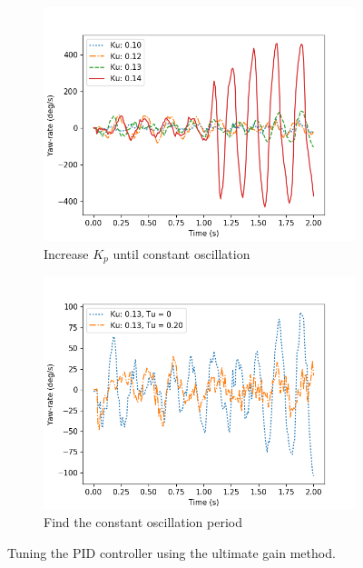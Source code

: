 
\begin{figure}
	\begin{subfigure}[b]{0.49\textwidth}
		\includegraphics[width=\textwidth]{pics/straight_ku.png}
		\caption{Increase $K_p$ until constant oscillation}
		\label{fig:ultimate_gain}
	\end{subfigure}
	\begin{subfigure}[b]{0.49\textwidth}
		\includegraphics[width=\textwidth]{pics/straight_ku_with_tu.png}
		\caption{Find the constant oscillation period}
		\label{fig:gain_tuning}
	\end{subfigure}
	\caption{Tuning the PID controller using the ultimate gain method.}
\end{figure}

